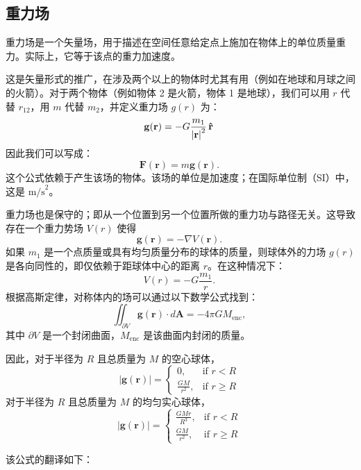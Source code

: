 \subsection{重力场}  
重力场是一个矢量场，用于描述在空间任意给定点上施加在物体上的单位质量重力。实际上，它等于该点的重力加速度。

这是矢量形式的推广，在涉及两个以上的物体时尤其有用（例如在地球和月球之间的火箭）。对于两个物体（例如物体 2 是火箭，物体 1 是地球），我们可以用 \( r \) 代替 \( r_{12} \)，用 \( m \) 代替 \( m_2 \)，并定义重力场 \( g(r) \) 为：
\[
\mathbf {g} (\mathbf {r} )=-G{m_{1} \over {{\vert \mathbf {r} \vert }^{2}}}\,\mathbf {\hat {r}}~
\]
因此我们可以写成：
\[
\mathbf {F} (\mathbf {r} )=m\mathbf {g} (\mathbf {r} ).~
\]
这个公式依赖于产生该场的物体。该场的单位是加速度；在国际单位制（SI）中，这是 \( \text{m/s}^2 \)。

重力场也是保守的；即从一个位置到另一个位置所做的重力功与路径无关。这导致存在一个重力势场 \( V(r) \) 使得
\[
\mathbf {g} (\mathbf {r} )=-\nabla V(\mathbf {r} ).~
\]
如果 \( m_1 \) 是一个点质量或具有均匀质量分布的球体的质量，则球体外的力场 \( g(r) \) 是各向同性的，即仅依赖于距球体中心的距离 \( r \)。在这种情况下：
\[
V(r) = -G \frac{m_1}{r}.~
\]
根据高斯定律，对称体内的场可以通过以下数学公式找到：
\[
\iint_{\partial V} \mathbf{g(r)} \cdot d\mathbf{A} = -4 \pi G M_{\text{enc}},~
\]
其中 \( \partial V \) 是一个封闭曲面，\( M_{\text{enc}} \) 是该曲面内封闭的质量。

因此，对于半径为 \( R \) 且总质量为 \( M \) 的空心球体，
\[
|\mathbf{g(r)}| = 
\begin{cases} 
0, & \text{if } r < R \\ 
\frac{GM}{r^2}, & \text{if } r \geq R 
\end{cases}~
\]
对于半径为 \( R \) 且总质量为 \( M \) 的均匀实心球体，
\[
|\mathbf{g(r)}| = 
\begin{cases} 
\frac{GMr}{R^3}, & \text{if } r < R \\ 
\frac{GM}{r^2}, & \text{if } r \geq R 
\end{cases}~
\]

该公式的翻译如下：


